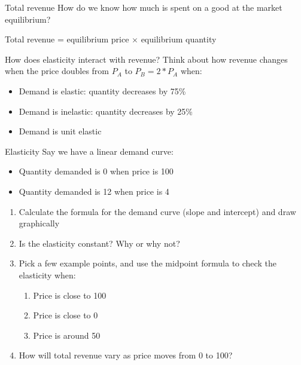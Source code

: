 \documentclass[aspectratio=169]{beamer}
\begin{document}
 \begin{frame}{Total revenue}
    How do we know how much is spent on a good at the market equilibrium?

    \medskip

    Total revenue = equilibrium price $\times$ equilibrium quantity

    \medskip

    How does elasticity interact with revenue? Think about how revenue changes when the price doubles from $P_A$ to $P_B = 2*P_A$ when:
    \begin{itemize}
        \item Demand is elastic: quantity decreases by 75\%
        \item Demand is inelastic: quantity decreases by 25\%
        \item Demand is unit elastic
    \end{itemize}

 \end{frame}

 \begin{frame}{Elasticity}
    Say we have a linear demand curve:
    \begin{itemize}
        \item Quantity demanded is 0 when price is 100
        \item Quantity demanded is 12 when price is 4
    \end{itemize}
    
    \medskip

    \begin{enumerate}
        \item Calculate the formula for the demand curve (slope and intercept) and draw graphically
        \item Is the elasticity constant? Why or why not?
        \item Pick a few example points, and use the midpoint formula to check the elasticity when:
            \begin{enumerate}
                \item Price is close to 100
                \item Price is close to 0
                \item Price is around 50
            \end{enumerate}
        \item How will total revenue vary as price moves from 0 to 100?
    \end{enumerate}

 \end{frame}
\end{document}
